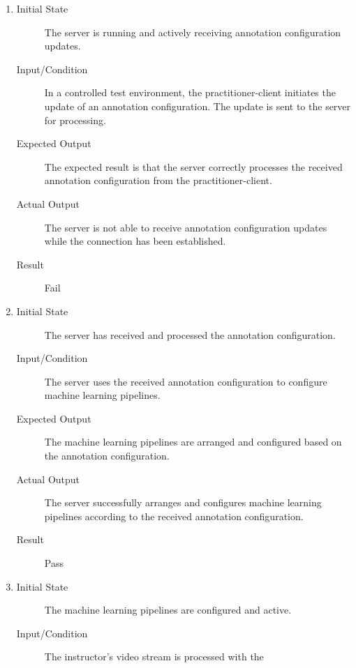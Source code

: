 \documentclass[12pt, titlepage]{article}
\begin{document}
\begin{enumerate}[FR-T1]
  \item \label{FRT7}
    \begin{description}
    \item[Initial State] The server is running and actively receiving annotation
      configuration updates.
    \item[Input/Condition] In a controlled test environment, the
      practitioner-client initiates the update of an annotation configuration.
      The update is sent to the server for processing.
    \item[Expected Output] The expected result is that the server correctly
      processes the received annotation configuration from the
      practitioner-client.
    \item[Actual Output] The server is not able to receive annotation configuration
      updates while the connection has been established.
    \item[Result] Fail
    \end{description}
  \item \label{FRT8}
    \begin{description}
    \item[Initial State] The server has received and processed the annotation
      configuration.
    \item[Input/Condition] The server uses the received annotation configuration to
      configure machine learning pipelines.
    \item[Expected Output] The machine learning pipelines are arranged and
      configured based on the annotation configuration.
    \item[Actual Output] The server successfully arranges and configures machine
      learning pipelines according to the received annotation configuration.
    \item[Result] Pass
    \end{description}
  \item \label{FRT9}
    \begin{description}
    \item[Initial State] The machine learning pipelines are configured and active.
    \item[Input/Condition] The instructor's video stream is processed with the

\end{description}
\end{enumerate}
\end{document}
